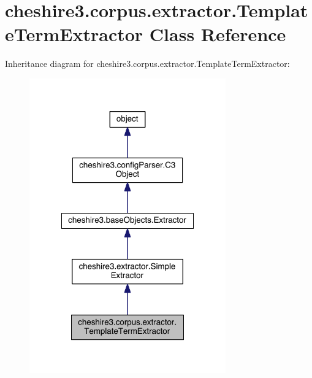 \hypertarget{classcheshire3_1_1corpus_1_1extractor_1_1_template_term_extractor}{\section{cheshire3.\-corpus.\-extractor.\-Template\-Term\-Extractor Class Reference}
\label{classcheshire3_1_1corpus_1_1extractor_1_1_template_term_extractor}
}


Inheritance diagram for cheshire3.\-corpus.\-extractor.\-Template\-Term\-Extractor\-:
\nopagebreak
\begin{figure}[H]
\begin{center}
\leavevmode
\includegraphics[width=240pt]{classcheshire3_1_1corpus_1_1extractor_1_1_template_term_extractor__inherit__graph}
\end{center}
\end{figure}


